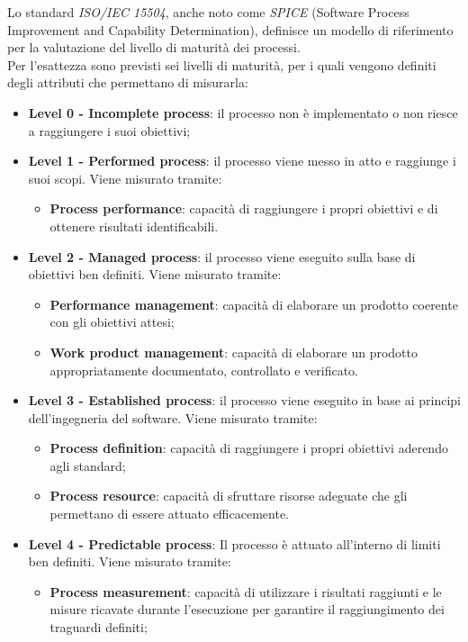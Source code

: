 Lo standard \textit{ISO/IEC 15504}, anche noto come \textit{SPICE} (Software Process Improvement and Capability Determination), definisce un modello di riferimento per la valutazione del livello di maturità dei processi. \\ 
Per l'esattezza sono previsti sei livelli di maturità, per i quali vengono definiti degli attributi che permettano di misurarla:
\begin{itemize}
\item\textbf{Level 0 - Incomplete process}: il processo non è implementato o non riesce a raggiungere i suoi obiettivi;
\item\textbf{Level 1 - Performed process}: il processo viene messo in atto e raggiunge i suoi scopi. Viene misurato tramite:
\begin{itemize}
\item\textbf{Process performance}: capacità di raggiungere i propri obiettivi e di ottenere risultati identificabili.
\end{itemize}
\item\textbf{Level 2 - Managed process}: il processo viene eseguito sulla base di obiettivi ben definiti. Viene misurato tramite:
\begin{itemize}
\item\textbf{Performance management}: capacità di elaborare un prodotto coerente con gli obiettivi attesi;
\item\textbf{Work product management}: capacità di elaborare un prodotto appropriatamente documentato, controllato e verificato.
\end{itemize}
\item\textbf{Level 3 - Established process}: il processo viene eseguito in base ai principi dell’ingegneria del software. Viene misurato tramite:
\begin{itemize}
\item\textbf{Process definition}: capacità di raggiungere i propri obiettivi aderendo agli standard;
\item\textbf{Process resource}: capacità di sfruttare risorse adeguate che gli permettano di essere attuato efficacemente.
\end{itemize}
\item\textbf{Level 4 - Predictable process}: Il processo è attuato all'interno di limiti ben definiti. Viene misurato tramite:
\begin{itemize}
\item\textbf{Process measurement}: capacità di utilizzare i risultati raggiunti e le misure ricavate durante l'esecuzione per garantire il raggiungimento dei traguardi definiti;

\end{itemize}
\end{itemize}
